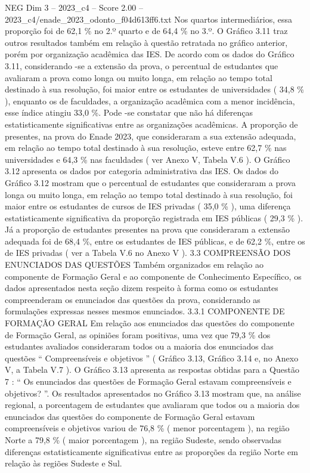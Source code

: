 \begin{textsample}{NEG Dim 3 – 2023\_c4 – Score 2.00 – 2023\_c4/enade\_2023\_odonto\_f04d613ff6.txt}
Nos quartos intermediários, essa proporção foi de 62,1 \% no 2.º quarto e de 64,4 \% no 3.º.
O Gráfico 3.11 traz outros resultados também em relação à questão retratada no gráfico anterior, porém por organização acadêmica das IES.
De acordo com os dados do Gráfico 3.11, considerando -se a extensão da prova, o percentual de estudantes que avaliaram a prova como longa ou muito longa, em relação ao tempo total destinado à sua resolução, foi maior entre os estudantes de universidades ( 34,8 \% ), enquanto os de faculdades, a organização acadêmica com a menor incidência, esse índice atingiu 33,0 \%.
Pode -se constatar que não há diferenças estatisticamente significativas entre as organizações acadêmicas.
A proporção de presentes, na prova do Enade 2023, que consideraram a sua extensão adequada, em relação ao tempo total destinado à sua resolução, esteve entre 62,7 \% nas universidades e 64,3 \% nas faculdades ( ver Anexo V, Tabela V.6 ).
O Gráfico 3.12 apresenta os dados por categoria administrativa das IES.
Os dados do Gráfico 3.12 mostram que o percentual de estudantes que consideraram a prova longa ou muito longa, em relação ao tempo total destinado à sua resolução, foi maior entre os estudantes de cursos de IES privadas ( 35,0 \% ), uma diferença estatisticamente significativa da proporção registrada em IES públicas ( 29,3 \% ).
Já a proporção de estudantes presentes na prova que consideraram a extensão adequada foi de 68,4 \%, entre os estudantes de IES públicas, e de 62,2 \%, entre os de IES privadas ( ver a Tabela V.6 no Anexo V ). 3.3 COMPREENSÃO DOS ENUNCIADOS DAS QUESTÕES Também organizados em relação ao componente de Formação Geral e ao componente de Conhecimento Específico, os dados apresentados nesta seção dizem respeito à forma como os estudantes compreenderam os enunciados das questões da prova, considerando as formulações expressas nesses mesmos enunciados. 3.3.1 COMPONENTE DE FORMAÇÃO GERAL Em relação aos enunciados das questões do componente de Formação Geral, as opiniões foram positivas, uma vez que 79,3 \% dos estudantes avaliados consideraram todos ou a maioria dos enunciados das questões “ Compreensíveis e objetivos ” ( Gráfico 3.13, Gráfico 3.14 e, no Anexo V, a Tabela V.7 ).
O Gráfico 3.13 apresenta as respostas obtidas para a Questão 7 : “ Os enunciados das questões de Formação Geral estavam compreensíveis e objetivos? ”.
Os resultados apresentados no Gráfico 3.13 mostram que, na análise regional, a porcentagem de estudantes que avaliaram que todos ou a maioria dos enunciados das questões do componente de Formação Geral estavam compreensíveis e objetivos variou de 76,8 \% ( menor porcentagem ), na região Norte a 79,8 \% ( maior porcentagem ), na região Sudeste, sendo observadas diferenças estatisticamente significativas entre as proporções da região Norte em relação às regiões Sudeste e Sul.

\end{textsample}
